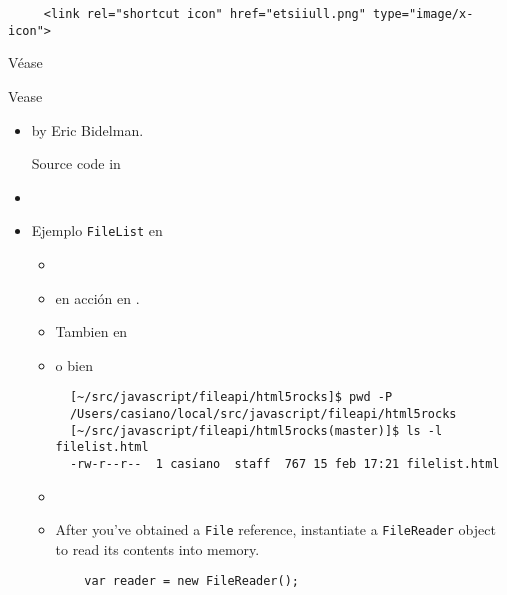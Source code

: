 \begin{verbatim}
     <link rel="shortcut icon" href="etsiiull.png" type="image/x-icon">
\end{verbatim}

Véase


Vease
\begin{itemize}
\item
{}
by Eric Bidelman.

Source code in 
\item
{}
\item Ejemplo \verb|FileList| en 
  \begin{itemize}
  \item
  \item
  en acción en 
  .
  \item
  Tambien en 
  \item
  o bien 
  \begin{verbatim}
  [~/src/javascript/fileapi/html5rocks]$ pwd -P
  /Users/casiano/local/src/javascript/fileapi/html5rocks
  [~/src/javascript/fileapi/html5rocks(master)]$ ls -l filelist.html 
  -rw-r--r--  1 casiano  staff  767 15 feb 17:21 filelist.html
  \end{verbatim}
    \item
\end{itemize}

\begin{itemize}
  \item
    After you've obtained a \verb|File| reference, instantiate a \verb|FileReader| object
    to read its contents into memory. 
    \begin{verbatim}
    var reader = new FileReader();
    \end{verbatim}


\end{itemize}
\end{itemize}
